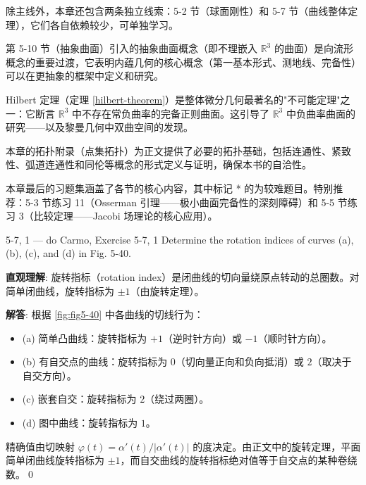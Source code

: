 \begin{Remark}
除主线外，本章还包含两条独立线索：5-2 节（球面刚性）和 5-7 节（曲线整体定理），它们各自依赖较少，可单独学习。
\end{Remark}

\begin{Remark}
第 5-10 节（抽象曲面）引入的抽象曲面概念（即不理嵌入 $\mathbb{R}^3$ 的曲面）是向流形概念的重要过渡，它表明内蕴几何的核心概念（第一基本形式、测地线、完备性）可以在更抽象的框架中定义和研究。
\end{Remark}

\begin{Remark}
Hilbert 定理（定理 \ref{hilbert-theorem}）是整体微分几何最著名的"不可能定理"之一：它断言 $\mathbb{R}^3$ 中不存在常负曲率的完备正则曲面。这引导了 $\mathbb{R}^3$ 中负曲率曲面的研究——以及黎曼几何中双曲空间的发现。
\end{Remark}

\begin{Remark}
本章的拓扑附录（点集拓扑）为正文提供了必要的拓扑基础，包括连通性、紧致性、弧道连通性和同伦等概念的形式定义与证明，确保本书的自洽性。
\end{Remark}

\begin{Remark}
本章最后的习题集涵盖了各节的核心内容，其中标记 * 的为较难题目。特别推荐：5-3 节练习 11（Osserman 引理——极小曲面完备性的深刻障碍）和 5-5 节练习 3（比较定理——Jacobi 场理论的核心应用）。
\end{Remark}

\begin{exercise}{5-7, 1 — do Carmo, Exercise 5-7, 1}
Determine the rotation indices of curves (a), (b), (c), and (d) in Fig. 5-40.
\end{exercise}
\begin{solution}
\textbf{直观理解}: 旋转指标（rotation index）是闭曲线的切向量绕原点转动的总圈数。对简单闭曲线，旋转指标为 $\pm 1$（由旋转定理）。

\textbf{解答}: 根据 \cref{fig:fig5-40} 中各曲线的切线行为：
\begin{itemize}
  \item (a) 简单凸曲线：旋转指标为 $+1$（逆时针方向）或 $-1$（顺时针方向）。
  \item (b) 有自交点的曲线：旋转指标为 $0$（切向量正向和负向抵消）或 $2$（取决于自交方向）。
  \item (c) 嵌套自交：旋转指标为 $2$（绕过两圈）。
  \item (d) 图中曲线：旋转指标为 $1$。
\end{itemize}
精确值由切映射 $\varphi(t)=\alpha'(t)/|\alpha'(t)|$ 的度决定。由正文中的旋转定理，平面简单闭曲线旋转指标为 $\pm 1$，而自交曲线的旋转指标绝对值等于自交点的某种卷绕数。\qed
\end{solution}

